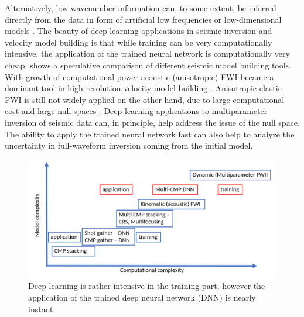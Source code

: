 \documentclass[paper,twocolomn]{geophysics}
\begin{document}
Alternatively, low wavenumber information can, to some extent, be inferred directly from the data in form of artificial low frequencies \citep{ovcharenkoNeuralNetworkBased2017, ovcharenkoLowFrequencyDataExtrapolation2018, ovcharenko2019deep, jin2018learn, sunLowFrequencyExtrapolation2018, kazei2019realistically} or low-dimensional models \citep[e.g.][]{polo2018, wu2018inversionnet}. The beauty of deep learning applications in seismic inversion and velocity model building is that while training can be very computationally intensive, the application of the trained neural network is computationally very cheap.  shows a speculative comparison of different seismic model building tools. With growth of computational power acoustic (anisotropic) FWI became a dominant tool in high-resolution velocity model building \citep[e.g.][]{warner2013}. Anisotropic elastic FWI is still not widely applied on the other hand, due to large computational cost and large null-spaces \citep{kohn2015,kazei2018,kazei2019scattering, podgornovaResolutionVTIAnisotropy2018}. Deep learning applications to multiparameter inversion of seismic data \citep{ivanov2017traveltime, dramsch2019deep, zhang2019regularized} can, in principle, help address the issue of the null space.
The ability to apply the trained neural network fast can also help to analyze the uncertainty in full-waveform inversion coming from the initial model.

\begin{figure}
	\centering
	\includegraphics[width=0.9\linewidth]{Fig/learningParadigm}
	\caption{Deep learning is rather intensive in the training part, however the application of the trained deep neural network (DNN) is nearly instant}
	\label{fig:learningParadigm}
\end{figure}
\end{document}
